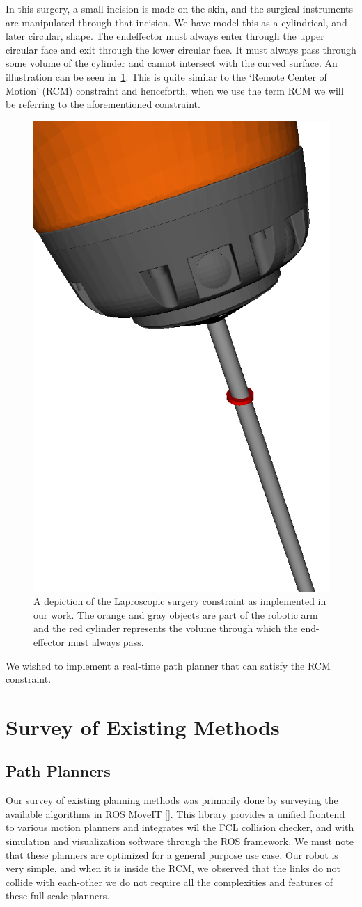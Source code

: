 \documentclass[BTech]{iitmdiss}
\begin{document}
    In this surgery, a small incision is made on the skin, and the surgical instruments are manipulated through that incision.
    We have model this as a cylindrical, and later circular, shape.
    The endeffector must always enter through the upper circular face and exit through the lower circular face.
    It must always pass through some volume of the cylinder and cannot intersect with the curved surface.
    An illustration can be seen in~\ref{fig:RCM}.
    This is quite similar to the `Remote Center of Motion' (RCM) constraint and henceforth, when we use the term RCM we will be referring to the aforementioned constraint.

    \begin{figure}
        \centering
        \includegraphics[height= 0.5\textwidth]{./img/rcm-constraint}
        \caption{A depiction of the Laproscopic surgery constraint as implemented in our work. The orange and gray objects are part of the robotic arm and the red cylinder represents the volume through which the end-effector must always pass.}
        \label{fig:RCM}
    \end{figure}

    We wished to implement a real-time path planner that can satisfy the RCM constraint.


    \section{Survey of Existing Methods}

    \subsection{Path Planners}
    Our survey of existing planning methods was primarily done by surveying the available algorithms in ROS MoveIT [\cite{Coleman_Sucan_Chitta_Correll_2014}].
    This library provides a unified frontend to various motion planners and integrates wil the FCL collision checker, and with simulation and visualization software through the ROS framework.
    We must note that these planners are optimized for a general purpose use case.
    Our robot is very simple, and when it is inside the RCM, we observed that the links do not collide with each-other we do not require all the complexities and features of these full scale planners.
\end{document}
